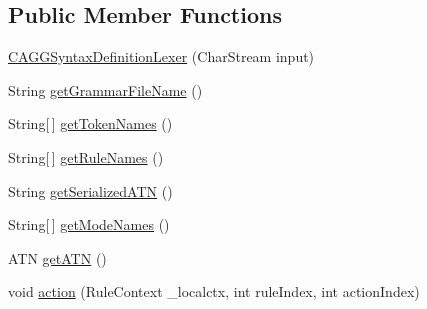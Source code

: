\subsection*{Public Member Functions}
\begin{DoxyCompactItemize}
\item 
\hyperlink{classit_1_1emarolab_1_1cagg_1_1core_1_1language_1_1parser_1_1ANTLRInterface_1_1ANTLRGenerated_1_1CAGGSyntaxDefinitionLexer_aebc1f756f902104eb87aff0fe40930f2}{C\-A\-G\-G\-Syntax\-Definition\-Lexer} (Char\-Stream input)
\item 
String \hyperlink{classit_1_1emarolab_1_1cagg_1_1core_1_1language_1_1parser_1_1ANTLRInterface_1_1ANTLRGenerated_1_1CAGGSyntaxDefinitionLexer_ab281213c4c8077d4aafcd09338ea4445}{get\-Grammar\-File\-Name} ()
\item 
String\mbox{[}$\,$\mbox{]} \hyperlink{classit_1_1emarolab_1_1cagg_1_1core_1_1language_1_1parser_1_1ANTLRInterface_1_1ANTLRGenerated_1_1CAGGSyntaxDefinitionLexer_adc5a7a64ef8f842b096b6f610771254b}{get\-Token\-Names} ()
\item 
String\mbox{[}$\,$\mbox{]} \hyperlink{classit_1_1emarolab_1_1cagg_1_1core_1_1language_1_1parser_1_1ANTLRInterface_1_1ANTLRGenerated_1_1CAGGSyntaxDefinitionLexer_a7cae7adc7e241274210761035f181ea5}{get\-Rule\-Names} ()
\item 
String \hyperlink{classit_1_1emarolab_1_1cagg_1_1core_1_1language_1_1parser_1_1ANTLRInterface_1_1ANTLRGenerated_1_1CAGGSyntaxDefinitionLexer_ad0a8bdd7a5d5f9b4e85b729f75a064f4}{get\-Serialized\-A\-T\-N} ()
\item 
String\mbox{[}$\,$\mbox{]} \hyperlink{classit_1_1emarolab_1_1cagg_1_1core_1_1language_1_1parser_1_1ANTLRInterface_1_1ANTLRGenerated_1_1CAGGSyntaxDefinitionLexer_a3fb8aab21cea2071cce947235eeed513}{get\-Mode\-Names} ()
\item 
A\-T\-N \hyperlink{classit_1_1emarolab_1_1cagg_1_1core_1_1language_1_1parser_1_1ANTLRInterface_1_1ANTLRGenerated_1_1CAGGSyntaxDefinitionLexer_a695b952b4098e2aff6afcfba0d4e3160}{get\-A\-T\-N} ()
\item 
void \hyperlink{classit_1_1emarolab_1_1cagg_1_1core_1_1language_1_1parser_1_1ANTLRInterface_1_1ANTLRGenerated_1_1CAGGSyntaxDefinitionLexer_aa41b1afabe5ce4101ce877d01c740a3c}{action} (Rule\-Context \-\_\-localctx, int rule\-Index, int action\-Index)
\end{DoxyCompactItemize}
